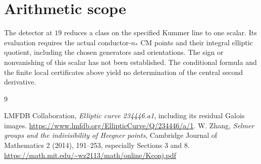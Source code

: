 \documentclass[11pt]{article}
\begin{document}
\section{Arithmetic scope}
The detector at $19$ reduces a class on the specified Kummer line
to one scalar. Its evaluation requires the actual conductor-$n_*$
CM points and their integral elliptic quotient, including the
chosen generators and orientations. The sign or nonvanishing of this
scalar has not been established. The conditional formula and the
finite local certificates above yield no determination of the
central second derivative.
\begin{thebibliography}{9}

LMFDB Collaboration, \emph{Elliptic curve 234446.a1}, including its
residual Galois images. \url{https://www.lmfdb.org/EllipticCurve/Q/234446/a/1}.
W. Zhang,
\emph{Selmer groups and the indivisibility
of Heegner points},
Cambridge Journal of Mathematics 2 (2014),
191--253, especially Sections 3 and 8.
\url{https://math.mit.edu/~wz2113/math/online/Kconj.pdf}

\end{thebibliography}
\end{document}
